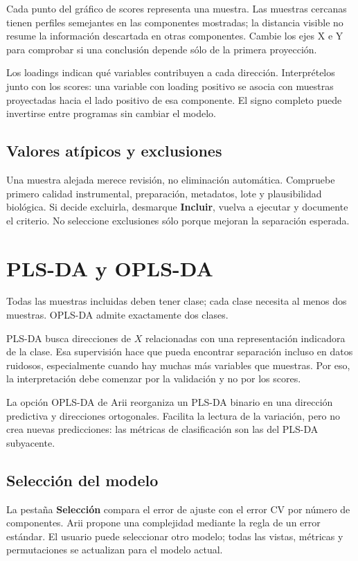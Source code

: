 \documentclass[11pt,a4paper,openany]{report}
\newcommand{\menu}[1]{\textbf{#1}}
\begin{document}
Cada punto del gráfico de scores representa una muestra. Las muestras cercanas
tienen perfiles semejantes en las componentes mostradas; la distancia visible
no resume la información descartada en otras componentes. Cambie los ejes X e Y
para comprobar si una conclusión depende sólo de la primera proyección.

Los loadings indican qué variables contribuyen a cada dirección. Interprételos
junto con los scores: una variable con loading positivo se asocia con muestras
proyectadas hacia el lado positivo de esa componente. El signo completo puede
invertirse entre programas sin cambiar el modelo.

\section{Valores atípicos y exclusiones}

Una muestra alejada merece revisión, no eliminación automática. Compruebe primero calidad instrumental, preparación, metadatos, lote y plausibilidad biológica. Si decide excluirla, desmarque \menu{Incluir}, vuelva a ejecutar y documente el criterio. No seleccione exclusiones sólo porque mejoran la separación esperada.

\chapter{PLS-DA y OPLS-DA}

Todas las muestras incluidas deben tener clase; cada clase necesita al menos dos
muestras. OPLS-DA admite exactamente dos clases.

PLS-DA busca direcciones de $X$ relacionadas con una representación indicadora
de la clase. Esa supervisión hace que pueda encontrar separación incluso en datos ruidosos, especialmente cuando hay muchas más variables que muestras. Por eso, la interpretación debe comenzar por la validación y no por los scores.

La opción OPLS-DA de Arii reorganiza un PLS-DA binario en una dirección
predictiva y direcciones ortogonales. Facilita la lectura de la variación, pero
no crea nuevas predicciones: las métricas de clasificación son las del PLS-DA
subyacente.

\section{Selección del modelo}

La pestaña \menu{Selección} compara el error de ajuste con el error CV por número de componentes. Arii propone una complejidad mediante la regla de un error estándar. El usuario puede seleccionar otro modelo; todas las vistas, métricas y permutaciones se actualizan para el modelo actual.
\end{document}
